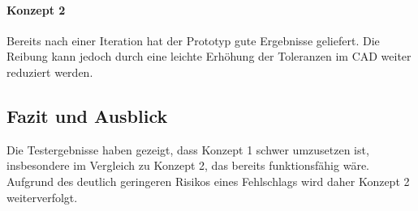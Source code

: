 \documentclass[main.tex]{subfiles} %
\begin{document}
\paragraph{Konzept 2}

Bereits nach einer Iteration hat der Prototyp gute Ergebnisse geliefert. 
Die Reibung kann jedoch durch eine leichte Erhöhung der Toleranzen im CAD weiter reduziert werden.

\subsection*{Fazit und Ausblick}

Die Testergebnisse haben gezeigt, dass Konzept 1 schwer umzusetzen ist, insbesondere im Vergleich zu Konzept 2, 
das bereits funktionsfähig wäre. Aufgrund des deutlich geringeren Risikos eines Fehlschlags wird daher Konzept 2 weiterverfolgt.
\end{document}
